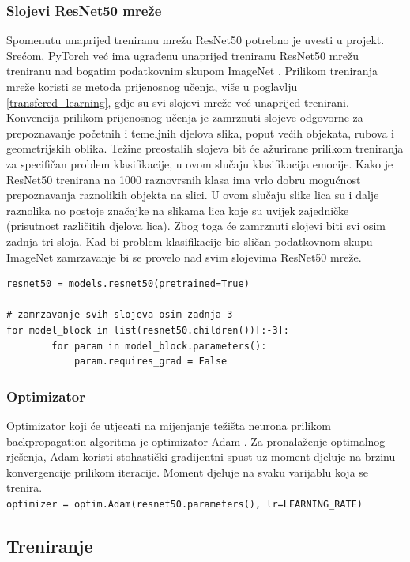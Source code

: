 \documentclass[times, utf8, zavrsni,numeric,pstricks]{fer}
\begin{document}
\subsubsection{Slojevi ResNet50 mreže}
Spomenutu unaprijed treniranu mrežu ResNet50 potrebno je uvesti u projekt. Srećom, PyTorch već ima ugrađenu unaprijed treniranu ResNet50 mrežu treniranu nad bogatim podatkovnim skupom ImageNet \cite{imagenet}. Prilikom treniranja mreže koristi se metoda prijenosnog učenja, više u poglavlju \ref{transfered_learning}, gdje su svi slojevi mreže već unaprijed trenirani. Konvencija prilikom prijenosnog učenja je zamrznuti slojeve odgovorne za prepoznavanje početnih i temeljnih djelova slika, poput većih objekata, rubova i geometrijskih oblika. Težine preostalih slojeva bit će ažurirane prilikom treniranja za specifičan problem klasifikacije, u ovom slučaju klasifikacija emocije. Kako je ResNet50 trenirana na 1000 raznovrsnih klasa ima vrlo dobru mogućnost prepoznavanja raznolikih objekta na slici. U ovom slučaju slike lica su i dalje raznolika no postoje značajke na slikama lica koje su uvijek zajedničke (prisutnost različitih djelova lica). Zbog toga će zamrznuti slojevi biti svi osim zadnja tri sloja. Kad bi problem klasifikacije bio sličan podatkovnom skupu ImageNet zamrzavanje bi se provelo nad svim slojevima ResNet50 mreže.
\begin{Verbatim}[fontsize=\small]
resnet50 = models.resnet50(pretrained=True)

# zamrzavanje svih slojeva osim zadnja 3
for model_block in list(resnet50.children())[:-3]:
        for param in model_block.parameters():
            param.requires_grad = False
\end{Verbatim}


\subsubsection{Optimizator}
Optimizator koji će utjecati na mijenjanje težišta neurona prilikom backpropagation algoritma je optimizator Adam \cite{adam}. Za pronalaženje optimalnog rješenja, Adam koristi stohastički gradijentni spust uz moment djeluje na brzinu konvergencije prilikom iteracije. Moment djeluje na svaku varijablu koja se trenira.\\
\lstinline"optimizer = optim.Adam(resnet50.parameters(), lr=LEARNING_RATE)"



\subsection{Treniranje}
\end{document}
